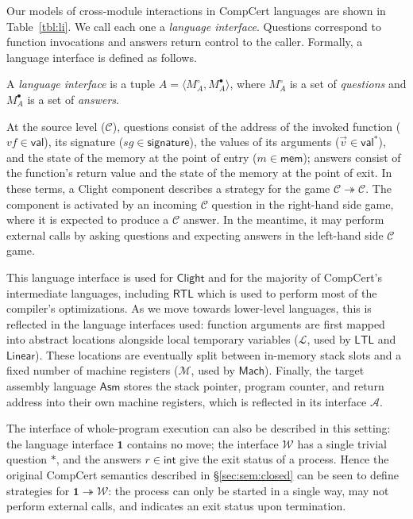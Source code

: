 \documentclass[sigplan,10pt,review,anonymous]{acmart}\settopmatter{printfolios=true,printccs=false,printacmref=false}
\newcommand{\kw}[1]{\ensuremath{ \mathsf{#1} }}
\newcommand{\que}{\circ}
\newcommand{\ans}{\bullet}
\begin{document}
Our models of cross-module interactions in CompCert languages
are shown in Table~\ref{tbl:li}.
We call each one a \emph{language interface}.
Questions correspond to function invocations
and answers return control to the caller.
Formally,
a language interface is defined as follows.

\begin{definition}
A \emph{language interface} is a tuple
$A = \langle M_A^\que, M_A^\ans \rangle$, where
$M_A^\que$ is a set of \emph{questions} and
$M_A^\ans$ is a set of \emph{answers}.
\end{definition}

At the source level ($\mathcal{C}$),
questions consist of
the address of the invoked function
($\mathit{vf} \in \kw{val}$),
its signature
($\mathit{sg} \in \kw{signature}$),
the values of its arguments
($\vec{v} \in \kw{val}^*$),
and the state of the memory at the point of entry
($m \in \kw{mem}$);
answers
consist of the function's return value
and the state of the memory at the point of exit.
In these terms,
a Clight component describes a strategy for the game
$\mathcal{C} \twoheadrightarrow \mathcal{C}$.
The component is activated by an incoming $\mathcal{C}$ question
in the right-hand side game,
where it is expected to produce a $\mathcal{C}$ answer.
In the meantime,
it may perform external calls by
asking questions and expecting answers
in the left-hand side $\mathcal{C}$ game.

This language interface is used for \kw{Clight} and
for the majority of CompCert's intermediate languages,
including \kw{RTL} which is used to perform
most of the compiler's optimizations.
As we move towards lower-level languages,
this is reflected in the language interfaces used:
function arguments are first mapped into
abstract locations alongside local temporary variables
($\mathcal{L}$, used by \kw{LTL} and \kw{Linear}).
These locations are eventually split between
in-memory stack slots and a fixed number of machine registers
($\mathcal{M}$, used by \kw{Mach}).
Finally, the target assembly language \kw{Asm}
stores the stack pointer, program counter,
and return address into their own machine registers,
which is reflected in its interface $\mathcal{A}$.

The interface of whole-program execution
can also be described in this setting:
the language interface $\mathbf{1}$ contains no move;
the interface $\mathcal{W}$ has a single trivial question $*$,
and the answers $r \in \kw{int}$
give the exit status of a process.
Hence the original CompCert semantics described in
\S\ref{sec:sem:closed}
can be seen to define strategies for
$\mathbf{1} \twoheadrightarrow \mathcal{W}$:
the process can only be started in a single way,
may not perform external calls,
and indicates an exit status upon termination.
\end{document}
